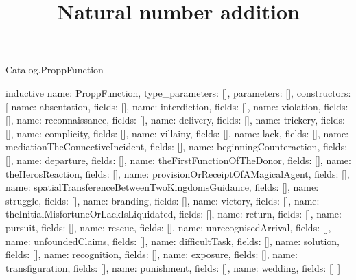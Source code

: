 \begin{lexlean}{Catalog.ProppFunction}
\title{Natural number addition}
\begin{semanticmodule}
inductive{
  name: ProppFunction,
  type_parameters: [],
  parameters: [],
  constructors: [
    {name: absentation, fields: []},
    {name: interdiction, fields: []},
    {name: violation, fields: []},
    {name: reconnaissance, fields: []},
    {name: delivery, fields: []},
    {name: trickery, fields: []},
    {name: complicity, fields: []},
    {name: villainy, fields: []},
    {name: lack, fields: []},
    {name: mediationTheConnectiveIncident, fields: []},
    {name: beginningCounteraction, fields: []},
    {name: departure, fields: []},
    {name: theFirstFunctionOfTheDonor, fields: []},
    {name: theHerosReaction, fields: []},
    {name: provisionOrReceiptOfAMagicalAgent, fields: []},
    {name: spatialTransferenceBetweenTwoKingdomsGuidance, fields: []},
    {name: struggle, fields: []},
    {name: branding, fields: []},
    {name: victory, fields: []},
    {name: theInitialMisfortuneOrLackIsLiquidated, fields: []},
    {name: return, fields: []},
    {name: pursuit, fields: []},
    {name: rescue, fields: []},
    {name: unrecognisedArrival, fields: []},
    {name: unfoundedClaims, fields: []},
    {name: difficultTask, fields: []},
    {name: solution, fields: []},
    {name: recognition, fields: []},
    {name: exposure, fields: []},
    {name: transfiguration, fields: []},
    {name: punishment, fields: []},
    {name: wedding, fields: []}
  ]
}
\end{semanticmodule}
\end{lexlean}
